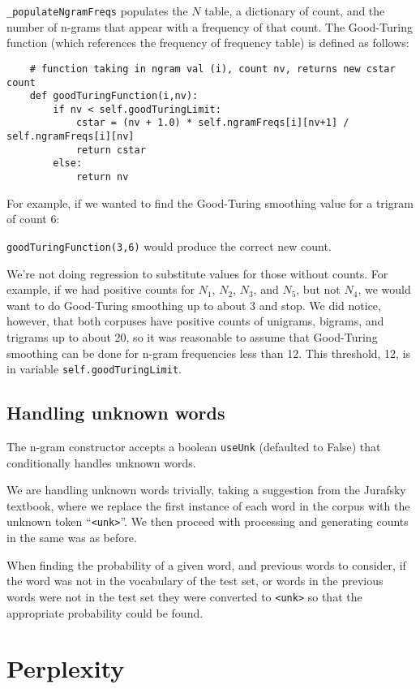 \documentclass{article}
\begin{document}
\texttt{\_populateNgramFreqs} populates the $N$ table, a dictionary of count, and the number of n-grams that appear with a frequency of that count. The Good-Turing function (which references the frequency of frequency table) is defined as follows:

{\small\begin{verbatim}
    # function taking in ngram val (i), count nv, returns new cstar count
    def goodTuringFunction(i,nv):
        if nv < self.goodTuringLimit:
            cstar = (nv + 1.0) * self.ngramFreqs[i][nv+1] / self.ngramFreqs[i][nv]
            return cstar
        else:
            return nv
\end{verbatim}}

For example, if we wanted to find the Good-Turing smoothing value for a trigram of count 6:\par\texttt{goodTuringFunction(3,6)} would produce the correct new count.

We're not doing regression to substitute values for those without counts. For example, if we had positive counts for $N_1$, $N_2$, $N_3$, and $N_5$, but not $N_4$, we would want to do Good-Turing smoothing up to about 3 and stop. We did notice, however, that both corpuses have positive counts of unigrams, bigrams, and trigrams up to about 20, so it was reasonable to assume that Good-Turing smoothing can be done for n-gram frequencies less than 12. This threshold, 12, is in variable \texttt{self.goodTuringLimit}.

\subsection{Handling unknown words}
The n-gram constructor accepts a boolean \texttt{useUnk} (defaulted to False) that conditionally handles unknown words.\par
We are handling unknown words trivially, taking a suggestion from the Jurafsky textbook, where we replace the first instance of each word in the corpus with the unknown token ``\texttt{<unk>}''. We then proceed with processing and generating counts in the same was as before.

When finding the probability of a given word, and previous words to consider, if the word was not in the vocabulary of the test set, or words in the previous words were not in the test set they were converted to \texttt{<unk>} so that the appropriate probability could be found.

\section{Perplexity}
\end{document}
